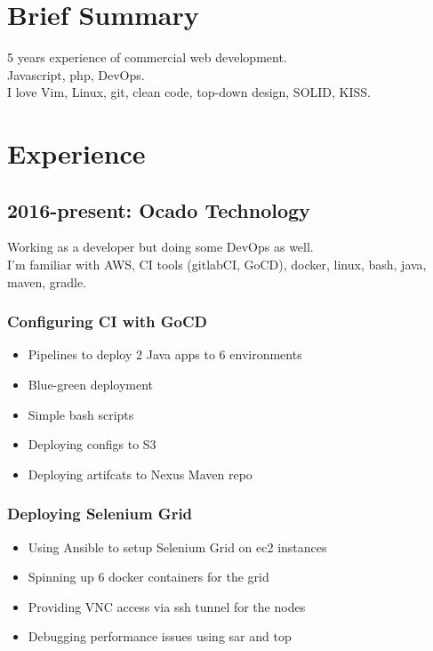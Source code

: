 \documentclass[a4paper, 14pt]{article}
\begin{document}
\begin{center}
	\textsc{\Huge{}}
\end{center}


\section{Brief Summary}
  5 years experience of commercial web development. \\
  Javascript, php, DevOps. \\
  I love Vim, Linux, git, clean code, top-down design, SOLID, KISS.

\section{Experience}
  \subsection{2016-present: Ocado Technology}

		Working as a developer but doing some DevOps as well. \\
		I'm familiar with AWS, CI tools (gitlabCI, GoCD), docker, linux, bash, java, maven, gradle.

		\subsubsection{Configuring CI with GoCD}
			\begin{itemize}
				\item Pipelines to deploy 2 Java apps to 6 environments \\
				\item Blue-green deployment \\
				\item Simple bash scripts \\
				\item Deploying configs to S3 \\
				\item Deploying artifcats to Nexus Maven repo 
			\end{itemize}

		\subsubsection{Deploying Selenium Grid}
			\begin{itemize}
				\item Using Ansible to setup Selenium Grid on ec2 instances \\
				\item Spinning up 6 docker containers for the grid \\
				\item Providing VNC access via ssh tunnel for the nodes \\
				\item Debugging performance issues using sar and top
			\end{itemize}
\end{document}
